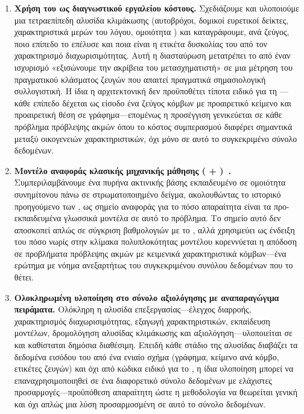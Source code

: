 \begin{enumerate}
    \item \textbf{Χρήση του  ως διαγνωστικού εργαλείου κόστους.}
    Σχεδιάζουμε και υλοποιούμε μια τετραεπίπεδη αλυσίδα κλιμάκωσης
    (αυτοβρόχοι, δομικοί ευρετικοί δείκτες, χαρακτηριστικά μερών του λόγου,
    ομοιότητα ) και καταγράφουμε, ανά ζεύγος, ποιο
    επίπεδο το επέλυσε και ποια είναι η ετικέτα δυσκολίας του από τον
    χαρακτηρισμό διαχωρισιμότητας.
    Αυτή η διασταύρωση μετατρέπει το
     από έναν ισχυρισμό «εξισώνουμε την ακρίβεια του
    μετασχηματιστή» σε μια μέτρηση του πραγματικού κλάσματος ζευγών που
    απαιτεί πραγματικά σημασιολογική συλλογιστική.
    Η ίδια η αρχιτεκτονική δεν προϋποθέτει τίποτα ειδικό για τη ---
    κάθε επίπεδο δέχεται ως είσοδο ένα ζεύγος κόμβων με προαιρετικό κείμενο και
    προαιρετική θέση σε γράφημα---επομένως η προσέγγιση γενικεύεται σε κάθε
    πρόβλημα πρόβλεψης ακμών όπου το κόστος συμπερασμού διαφέρει σημαντικά
    μεταξύ οικογενειών χαρακτηριστικών, όχι μόνο σε αυτό το συγκεκριμένο σύνολο
    δεδομένων.

    \item \textbf{Μοντέλο αναφοράς κλασικής μηχανικής μάθησης ( + )~\cite{cortes1995support}.}
    Συμπεριλαμβάνουμε ένα  πυρήνα ακτινικής βάσης εκπαιδευμένο σε
    ομοιότητα συνημίτονου  πάνω σε στρωματοποιημένο δείγμα,
    ακολουθώντας το ιστορικό προηγούμενο των \textcite{alhasan2006link}, ως σημείο αναφοράς για το πόσο απαραίτητα είναι τα
    προ-εκπαιδευμένα γλωσσικά μοντέλα σε αυτό το πρόβλημα.
    Το σημείο αυτό δεν αποσκοπεί απλώς σε σύγκριση βαθμολογιών με το
    , αλλά χρησιμεύει ως ένδειξη του πόσο νωρίς στην κλίμακα
    πολυπλοκότητας μοντέλου κορεννύεται η απόδοση σε προβλήματα πρόβλεψης
    ακμών με κειμενικά χαρακτηριστικά κόμβων---ένα ερώτημα με νόημα ανεξαρτήτως
    του συγκεκριμένου συνόλου δεδομένων που το θέτει.

    \item \textbf{Ολοκληρωμένη υλοποίηση στο σύνολο αξιολόγησης  με
    αναπαραγώγιμα πειράματα.} Ολόκληρη η αλυσίδα επεξεργασίας---έλεγχος
    διαρροής, χαρακτηρισμός διαχωρισιμότητας, εξαγωγή χαρακτηριστικών,
    εκπαίδευση μοντέλων, δρομολόγηση αλυσίδας κλιμάκωσης και
    αξιολόγηση---υλοποιείται σε  και καθίσταται δημόσια διαθέσιμη.
    Επειδή κάθε στάδιο της αλυσίδας διαβάζει τα δεδομένα εισόδου του από ένα
    ενιαίο σχήμα (γράφημα, κείμενο ανά κόμβο, ετικέτες ζευγών) και όχι από
    κώδικα ειδικό για το , η ίδια υλοποίηση μπορεί να
    επαναχρησιμοποιηθεί σε ένα διαφορετικό σύνολο δεδομένων με ελάχιστες
    προσαρμογές---προϋπόθεση απαραίτητη ώστε η μεθοδολογία να θεωρείται γενική
    και όχι απλώς μια λύση προσαρμοσμένη σε αυτό το σύνολο δεδομένων.

\end{enumerate}

